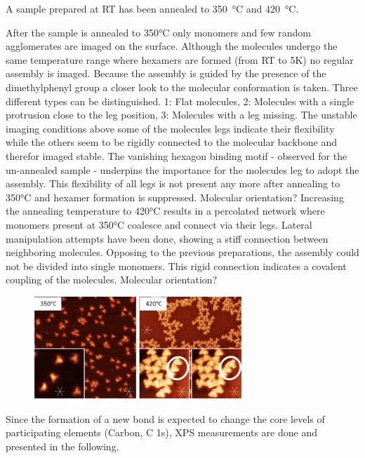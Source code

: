 A sample prepared at RT has been annealed to \SI{350}{\celsius} and \SI{420}{\celsius}.

After the sample is annealed to 350°C only monomers and few random agglomerates are imaged on the surface. Although the molecules undergo the same temperature range where hexamers are formed (from RT to 5K) no regular assembly is imaged. Because the assembly is guided by the presence of the dimethylphenyl group a closer look to the molecular conformation is taken. Three different types can be distinguished. 1: Flat molecules, 2: Molecules with a single protrusion close to the leg position, 3: Molecules with a leg missing.
The unstable imaging conditions above some of the molecules legs indicate their flexibility while the others seem to be rigidly connected to the molecular backbone and therefor imaged stable. The vanishing hexagon binding motif - observed for the un-annealed sample - underpins the importance for the molecules leg to adopt the assembly. This flexibility of all legs is not present any more after annealing to 350°C and hexamer formation is suppressed. Molecular orientation?
Increasing the annealing temperature to 420°C results in a percolated network where monomers present at 350°C coalesce and connect via their legs. Lateral manipulation attempts have been done, showing a stiff connection between neighboring molecules. Opposing to the previous preparations, the assembly could not be divided into single monomers. This rigid connection indicates a covalent coupling of the molecules. 
Molecular orientation?

\begin{figure}[] \centering
	\includegraphics[width=0.7\textwidth]{./images/hbbnc-ag-111-annealed}
	\caption{}
	\label{}
\end{figure}

Since the formation of a new bond is expected to change the core levels of participating elements (Carbon, C 1s), XPS measurements are done and presented in the following.

